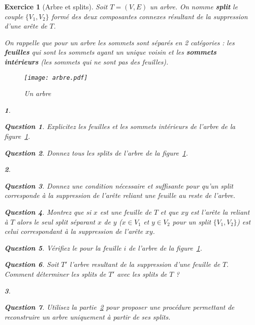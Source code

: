 \documentclass{article}
\theoremstyle{exostyle}
\newtheorem{exo}{Exercice}
\theoremstyle{partiestyle}
\newtheorem{partie}{}[exo]
\theoremstyle{questionstyle}
\newtheorem{questionpartie}{Question}[partie]
\begin{document}
\begin{exo}[Arbre et splits]
	Soit $T = (V, E)$ un arbre. On nomme {\bf\em split} le couple $\{V_1, V_2\}$ formé des deux composantes connexes résultant de la suppression d'une arête de $T$. 
	
	On rappelle que pour un arbre les sommets sont séparés en 2 catégories : les {\bf\em feuilles} qui sont les sommets ayant un unique voisin et les {\bf\em sommets intérieurs} (les sommets qui ne sont pas des feuilles).

	\begin{figure}[h]
		\begin{center}
			\texttt{[image: arbre.pdf]}
			\caption{Un arbre\label{arbre}} 
		\end{center}
	\end{figure}

	\begin{partie}

		\begin{questionpartie}
			Explicitez les feuilles et les sommets intérieurs de l'arbre de la figure~\ref{arbre}.
		\end{questionpartie}
		\begin{questionpartie}
			Donnez tous les splits de l'arbre de la figure~\ref{arbre}.
		\end{questionpartie}
	\end{partie}

	\begin{partie}
		\label{split-feuille}
		\begin{questionpartie}
			Donnez une condition nécessaire et suffisante pour qu'un split corresponde à la suppression de l'arête reliant une feuille au reste de l'arbre.
		\end{questionpartie}
		\begin{questionpartie}
			Montrez que si $x$ est une feuille de $T$ et que $xy$ est l'arête la reliant à $T$ alors le seul split séparant $x$ de $y$ ($x \in V_1$ et $y\in V_2$ pour un split $\{V_1, V_2\}$) est celui correspondant à la suppression de l'arête $xy$.
		\end{questionpartie}

		\begin{questionpartie}
			Vérifiez le pour la feuille $i$ de l'arbre de la figure~\ref{arbre}.
		\end{questionpartie}
		\begin{questionpartie}
			Soit $T'$ l'arbre resultant de la suppression d'une feuille de $T$. Comment déterminer les splits de $T'$ avec les splits de $T$ ?
		\end{questionpartie}
	\end{partie}	
	\begin{partie}
		\begin{questionpartie}
			Utilisez la partie~\ref{split-feuille} pour proposer une procédure permettant de reconstruire un arbre uniquement à partir de ses splits.
		\end{questionpartie}
		

\end{partie}
\end{exo}
\end{document}
